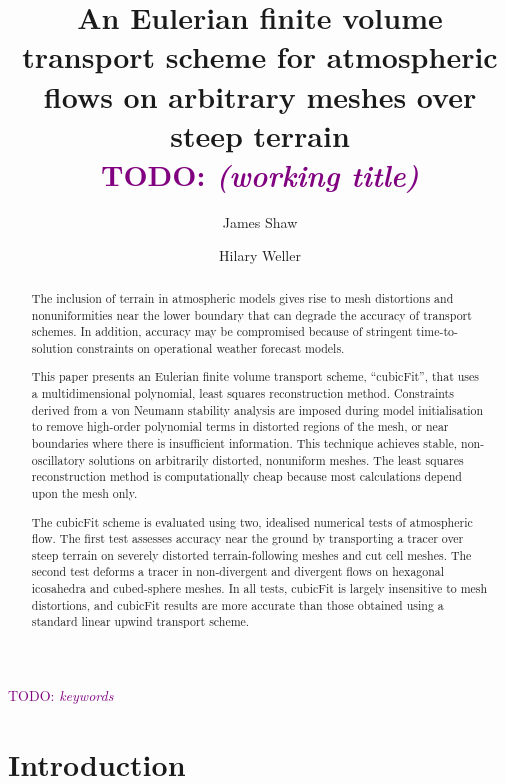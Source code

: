 \documentclass[times]{elsarticle}
\newcommand{\TODO}[1]{\textcolor{purple}{TODO: \emph{#1}}}
\begin{document}
\begin{frontmatter}
\title{An Eulerian finite volume transport scheme for atmospheric flows on arbitrary meshes over steep terrain \\ \TODO{(working title)}}
\author[uor]{James Shaw}
\author[uor]{Hilary Weller}

\address[uor]{Department of Meteorology, University of Reading, Reading, United Kingdom}

\begin{abstract}
The inclusion of terrain in atmospheric models gives rise to mesh distortions and nonuniformities near the lower boundary that can degrade the accuracy of transport schemes.  In addition, accuracy may be compromised because of stringent time-to-solution constraints on operational weather forecast models.

This paper presents an Eulerian finite volume transport scheme, ``cubicFit'', that uses a multidimensional polynomial, least squares reconstruction method.  Constraints derived from a von Neumann stability analysis are imposed during model initialisation to remove high-order polynomial terms in distorted regions of the mesh, or near boundaries where there is insufficient information.  This technique achieves stable, non-oscillatory solutions on arbitrarily distorted, nonuniform meshes.  The least squares reconstruction method is computationally cheap because most calculations depend upon the mesh only.

The cubicFit scheme is evaluated using two, idealised numerical tests of atmospheric flow.  The first test assesses accuracy near the ground by transporting a tracer over steep terrain on severely distorted terrain-following meshes and cut cell meshes.  The second test deforms a tracer in non-divergent and divergent flows on hexagonal icosahedra and cubed-sphere meshes.
In all tests, cubicFit is largely insensitive to mesh distortions, and cubicFit results are more accurate than those obtained using a standard linear upwind transport scheme.
\end{abstract}

\begin{keyword}
	\TODO{keywords}
\end{keyword}
\end{frontmatter}

\section{Introduction}

\end{document}
